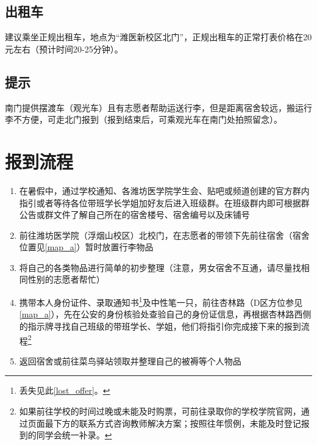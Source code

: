 \subsection[出租车]{出租车}
建议乘坐正规出租车，地点为“潍医新校区北门”，正规出租车的正常打表价格在20元左右（预计时间20-25分钟）。

\subsection[提示]{提示}
南门提供摆渡车（观光车）且有志愿者帮助运送行李，但是距离宿舍较远，搬运行李不方便，可走北门报到（报到结束后，可乘观光车在南门处拍照留念）。

\section[报到流程]{报到流程}
\begin{enumerate}
    \item 在暑假中，通过学校通知、各潍坊医学院学生会、贴吧或频道创建的官方群内指引或者等待各位带班学长学姐加好友后进入班级群。在班级群内即可根据群公告或群文件了解自己所在的宿舍楼号、宿舍编号以及床铺号
    \item 前往潍坊医学院（浮烟山校区）北校门，在志愿者的带领下先前往宿舍（宿舍位置见\uline{\ref{map_a}}）暂时放置行李物品
    \item 将自己的各类物品进行简单的初步整理（注意，男女宿舍不互通，请尽量找相同性别的志愿者帮忙）
    \item 携带本人身份证件、录取通知书\footnote{丢失见此\uline{\ref{lost_offer}}。}及中性笔一只，前往杏林路（D区方位参见\uline{\ref{map_a}}），先在公安的身份核验处查验自己的身份证信息，再根据杏林路西侧的指示牌寻找自己班级的带班学长、学姐，他们将指引你完成接下来的报到流程\footnote{如果前往学校的时间过晚或未能及时购票，可前往录取你的学校学院官网，通过页面最下方的联系方式咨询教师解决方案；按照往年惯例，未能及时登记报到的同学会统一补录。}
    \item 返回宿舍或前往菜鸟驿站领取并整理自己的被褥等个人物品
\end{enumerate}